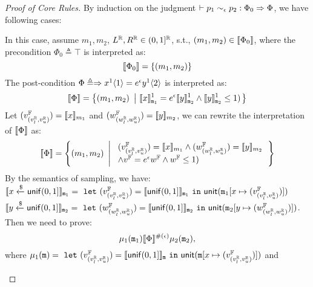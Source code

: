 \documentclass[a4paper,11pt]{article}
\begin{document}
\begin{proof}[Proof of Core Rules]
By induction on the judgment $\vdash p_1	
\sim_{\epsilon}
p_2 :
\Phi_0 \Rightarrow \Phi $, we have following cases:
\begin{itemize}
\caseL{{\small\[
\inferrule
{
	\empty
}
{
	\vdash
	\varx \samplel \uniform(0, 1] 	
	\sim_{\epsilon} 
	\vary \samplel \uniform(0, 1]
	:
	\top
	\Rightarrow
	\varx^1 \langle 1 \rangle 
	= 
	e^{\epsilon} \vary^1 \langle 2 \rangle 	
}~\textbf{unif}
\]}}
	In this case, 
	assume $m_1, m_2$, $L^{\mathbb{R}}, R^{\mathbb{R}} \in (0,1]^{\mathbb{R}}$, s.t.,
	$(m_1, m_2) \in \llbracket \Phi_0 \rrbracket$, where the precondition
	$
	\Phi_0 \triangleq
	\top
	$
	is interpreted as:
	\[
	\llbracket \Phi_0 \rrbracket =
	\left \{
	(m_1, m_2)
	\right \}
	\]
	The post-condition $\Phi \triangleq 
			\Rightarrow
	x^1 \langle 1 \rangle 
	= 
	e^{\epsilon} y^1 \langle 2 \rangle 	
	$ is interpreted as:
	\[
	\llbracket \Phi \rrbracket =
	\left \{
	(m_1, m_2)
	~ \left \vert ~
	\llbracket x \rrbracket_{\mathtt{m}_1}^1 =
	e^{\epsilon} \llbracket y \rrbracket_{\mathtt{m}_2}^1
		\land \llbracket y \rrbracket_{\mathtt{m}_2}^1 \leq 1)
	\right.
	\right \}
	\]
	Let $(v^{\mathbb{F}}_{(v^{\mathbb{R}}_{l}, v^{\mathbb{R}}_{u})}) = \llbracket x \rrbracket_{m_1}$ and 
	$(w^{\mathbb{F}}_{(w^{\mathbb{R}}_{l}, w^{\mathbb{R}}_{u})}) = \llbracket y \rrbracket_{m_2}$, we can rewrite the interpretation of $\llbracket \Phi \rrbracket$ as:
\[
	\llbracket \Phi \rrbracket =
	\left \{
	(m_1, m_2)
	~ \left \vert ~
	\begin{array}{l}
	(v^{\mathbb{F}}_{(v^{\mathbb{R}}_{l}, v^{\mathbb{R}}_{u})}) = \llbracket x \rrbracket_{m_1}
	\land 
	(w^{\mathbb{F}}_{(w^{\mathbb{R}}_{l}, w^{\mathbb{R}}_{u})}) = \llbracket y \rrbracket_{m_2}
	\\
	\land
	v^{\mathbb{F}} = e^{\epsilon}  w^{\mathbb{F}}
		\land w^{\mathbb{F}} \leq 1)
	\end{array}
	\right.
	\right \}
\]
	By the semantics of sampling, we have:\\
	$\llbracket x \xleftarrow{\$} \mathsf{unif}(0, 1] \rrbracket_{\mathtt{m}_1} =
	~\mathtt{let}~ (v^{\mathbb{F}}_{(v^{\mathbb{R}}_{l}, v^{\mathbb{R}}_{u})}) 
	= \llbracket \mathsf{unif}(0, 1] \rrbracket_{\mathtt{m}_1} 
	~\mathtt{in}~ 
	\mathsf{unit}(\mathtt{m}_1[x \mapsto (v^{\mathbb{F}}_{(v^{\mathbb{R}}_{l}, v^{\mathbb{R}}_{u})})])
	$
	\\
	$\llbracket y \xleftarrow{\$} \mathsf{unif}(0, 1] \rrbracket_{\mathtt{m}_2} = 
	~\mathtt{let}~ (w^{\mathbb{F}}_{(w^{\mathbb{R}}_{l}, w^{\mathbb{R}}_{u})})
	= \llbracket \mathsf{unif}(0, 1] \rrbracket_{\mathtt{m}_2} 
	~\mathtt{in}~ 
	\mathsf{unit}(\mathtt{m}_2[y \mapsto (w^{\mathbb{F}}_{(w^{\mathbb{R}}_{l}, w^{\mathbb{R}}_{u})})])
	$. \\
	Then we need to prove:
	\[\mu_1(\mathtt{m}_1) \llbracket \Phi \rrbracket^{\#(\epsilon)} \mu_2(\mathtt{m}_2),\]
	where 
	$\mu_1(\mathtt{m}) = 
	~\mathtt{let}~ (v^{\mathbb{F}}_{(v^{\mathbb{R}}_{l}, v^{\mathbb{R}}_{u})}) 
	= \llbracket \mathsf{unif}(0, 1] \rrbracket_{\mathtt{m}} 
	~\mathtt{in}~ 
	\mathsf{unit}(\mathtt{m}[x \mapsto (v^{\mathbb{F}}_{(v^{\mathbb{R}}_{l}, v^{\mathbb{R}}_{u})})])$ and
	\\

\end{itemize}
\end{proof}
\end{document}
